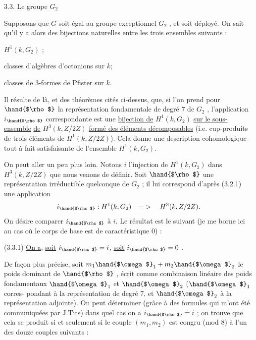 
3.3. Le groupe $G_2$

Supposons que $G$ soit égal au groupe exceptionnel $G_2$ , et soit déployé.
On sait qu'il y a alors des bijections naturelles entre les trois ensembles
suivants :

$H^1(k, G_2)$ ;

classes d'algèbres d'octonions sur $k$;

classes de 3-formes de Pfister sur $k$.

Il résulte de là, et des théorèmes cités ci-dessus, que, si l'on prend
pour $\hand{$\rho$}$ la représentation fondamentale de degré $7$ de $G_2$ , l'application
$i_{\hand{$\rho$}}$ correspondante est une \uline{bijection de} $H^1(k, G_2)$ \uline{sur le sous-ensemble}
\uline{de} $H^3(k, Z/2Z)$ \uline{formé des éléments décomposables} (i.e. cup-produits
de trois éléments de $H^1(k, Z/2Z)$). Cela donne une description cohomologique
tout à fait satisfaisante de l'ensemble $H^1(k, G_2)$.

On peut aller un peu plus loin. Notons $i$ l'injection de $H^1(k, G_2)$
dans $H^3(k, Z/2Z)$ que nous venons de définir. Soit $\hand{$\rho$}$ une représentation
irréductible quelconque de $G_2$ ; il lui correspond d'après (3.2.1) une
application
\[ i_{\hand{$\rho$}} : H^1(k, G_2) \quad -> \quad H^3(k, Z/2Z). \]
On désire comparer $i_{\hand{$\rho$}}$ à $i$. Le résultat est le suivant (je me borne
ici au cas où le corps de base est de caractéristique $0$) :

(3.3.1) \uline{On a}, \uline{soit} $i_{\hand{$\rho$}} = i$, \uline{soit} $i_{\hand{$\rho$}} = 0$ .

De façon plus précise, soit $m_1\hand{$\omega$}_1 + m_2\hand{$\omega$}_2$ le poids dominant de $\hand{$\rho$}$ , écrit
comme combinaison linéaire des poids fondamentaux $\hand{$\omega$}_1$ et $\hand{$\omega$}_2$ ($\hand{$\omega$}_1$ corres-%
pondant à la représentation de degré $7$, et $\hand{$\omega$}_2$ à la représentation adjointe).
On peut déterminer (grâce à des formules qui m'ont été communiquées par
J.Tits) dans quel cas on a $i_{\hand{$\rho$}} = i$ ; on trouve que cela se produit si
et seulement si le couple $(m_1, m_2)$ est congru (mod 8) à l'un des douze
couples suivants :

